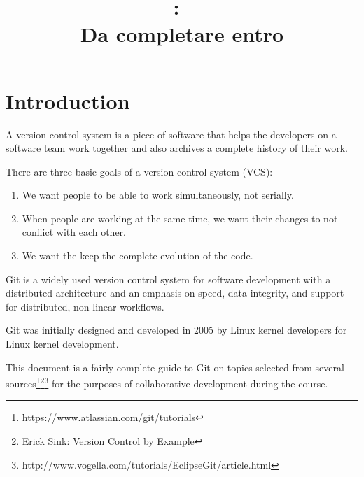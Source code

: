 \documentclass{article}
\title{
\vspace{2in}
\textmd{\textbf{\hmwkClass:\ \hmwkTitle}}\\
\normalsize\vspace{0.1in}\small{Da completare entro \hmwkDueDate}\\
\vspace{0.1in}\large{\textit{\hmwkClassInstructor}}
\vspace{3in}
}
\author{\textbf{\hmwkAuthorName}}
\date{} %
\newif\ifinstall
\begin{document}
\maketitle



\newpage
\tableofcontents
\newpage





 \section{Introduction}

A version control system is a piece of software that helps the
developers on a software team work together and also archives a
complete history of their work.

There are three basic goals of a version control system (VCS):

\begin{enumerate}
\item We want people to be able to work simultaneously, not serially.
\item When people are working at the same time, we want their changes
  to not conflict with each other.
\item We want the keep the complete evolution of the code.
\end{enumerate}

Git is a widely used version control system for software development
with a distributed architecture and an emphasis on speed, data
integrity, and support for distributed, non-linear workflows. 

Git was initially designed and developed in 2005 by Linux kernel
developers for Linux kernel development.

\ifinstall
\else
This document is a fairly complete guide to Git on topics selected
from several
sources\footnote{https://www.atlassian.com/git/tutorials}\footnote{Erick
  Sink: Version Control by
  Example}\footnote{http://www.vogella.com/tutorials/EclipseGit/article.html}
for the purposes of collaborative development during the course.
\end{document}
